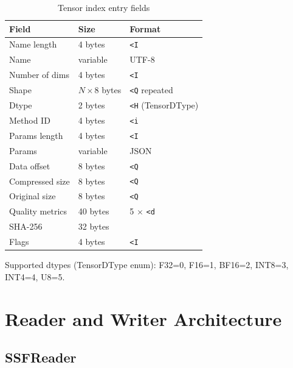 \documentclass[11pt,a4paper,openright]{book}
\begin{document}
\begin{table}[ht]
	\centering
	\caption{Tensor index entry fields}
	\begin{tabular}{lll}
		\toprule
		Field           & Size               & Format                    \\
		\midrule
		Name length     & 4 bytes            & \texttt{<I}               \\
		Name            & variable           & UTF-8                     \\
		Number of dims  & 4 bytes            & \texttt{<I}               \\
		Shape           & $N \times 8$ bytes & \texttt{<Q} repeated      \\
		Dtype           & 2 bytes            & \texttt{<H} (TensorDType) \\
		Method ID       & 4 bytes            & \texttt{<i}               \\
		Params length   & 4 bytes            & \texttt{<I}               \\
		Params          & variable           & JSON                      \\
		Data offset     & 8 bytes            & \texttt{<Q}               \\
		Compressed size & 8 bytes            & \texttt{<Q}               \\
		Original size   & 8 bytes            & \texttt{<Q}               \\
		Quality metrics & 40 bytes           & 5 $\times$ \texttt{<d}    \\
		SHA-256         & 32 bytes           &                           \\
		Flags           & 4 bytes            & \texttt{<I}               \\
		\bottomrule
	\end{tabular}
\end{table}

Supported dtypes (TensorDType enum): F32=0, F16=1, BF16=2, INT8=3, INT4=4, U8=5.

\section{Reader and Writer Architecture}

\subsection{SSFReader}
\end{document}

